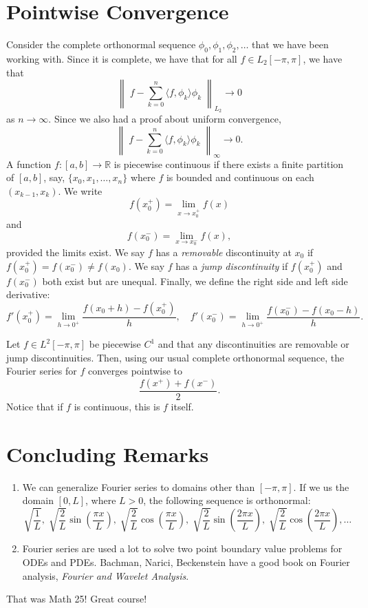 \documentclass[11pt]{article}
\theoremstyle{definition}
\newcommand{\R}{\mathbb{R}}                      %
\begin{document}
\section{Pointwise Convergence}
Consider the complete orthonormal sequence $\phi_0,\phi_1,\phi_2,\dots $ that we have been working with. Since it is complete, we have that for all $f\in L_2[-\pi,\pi]$, we have that
$$
\left\| \;f-\sum_{k=0}^n\langle f,\phi_k\rangle \phi_k\;\right\|_{L_2}\to 0
$$
as $n\to\infty$. Since we also had a proof about uniform convergence,
$$
\left\|\; f-\sum_{k=0}^n\langle f,\phi_k\rangle \phi_k\;\right\|_{\infty}\to 0.
$$
A function $f:[a,b]\to \R$ is piecewise continuous if there exists a finite partition of $[a,b]$, say, $\{x_0,x_1,\dots,x_n\}$ where $f$ is bounded and continuous on each $(x_{k-1},x_k)$. We write
$$ 
f(x_0^+)=\lim_{x\to x_0^+} f(x)
$$
and
$$
f(x_0^-)=\lim_{x\to x_0^-}f(x),
$$
provided the limits exist. We say $f$ has a \textit{removable} discontinuity at $x_0$ if $f(x_0^+)=f(x_0^-)\neq f(x_0)$. We say $f$ has a \textit{jump discontinuity} if $f(x_0^+)$ and $f(x_0^{-})$ both exist but are unequal. Finally, we define the right side and left side derivative:
$$
f'(x_0^+)=\lim_{h\to 0^+}\frac{f(x_0+h)-f(x_0^+)}{h},\quad f'(x_0^-)=\lim_{h\to 0^+}\frac{f(x_0^-)-f(x_0-h)}{h}.
$$
\begin{shaded}
\theorem Let $f\in L^2[-\pi,\pi]$ be piecewise $C^1$ and that any discontinuities are removable or jump discontinuities. Then, using our usual complete orthonormal sequence, the Fourier series for $f$ converges pointwise to
$$
\frac{f(x^+)+f(x^-)}{2}.
$$
Notice that if $f$ is continuous, this is $f$ itself.
\end{shaded}

\section{Concluding Remarks}
\begin{enumerate}
    \item We can generalize Fourier series to domains other than $[-\pi,\pi]$. If we us the domain $[0,L]$, where $L>0$, the following sequence is orthonormal:
    $$
    \sqrt{\frac{1}{L}},\; \sqrt{\frac{2}{L}}\sin\left(\frac{\pi x}{L}\right), \; \sqrt{\frac{2}{L}}\cos\left( \frac{\pi x}{L} \right), \; \sqrt{\frac{2}{L}}\sin\left( \frac{2 \pi x}{L}\right), \; \sqrt{\frac{2}{L}}\cos\left( \frac{2 \pi x}{L}\right),\dots
    $$
    \item Fourier series are used a lot to solve two point boundary value problems for ODEs and PDEs. Bachman, Narici, Beckenstein have a good book on Fourier analysis, \textit{Fourier and Wavelet Analysis}.
\end{enumerate}
That was Math 25! Great course!
\end{document}

